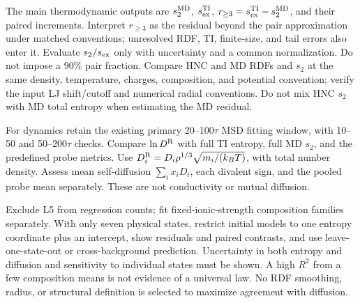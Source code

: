 \documentclass[11pt,a4paper]{article}
\begin{document}
The main thermodynamic outputs are $s_2^{\rm MD}$, $s_{\rm ex}^{\rm TI}$,
$r_{\ge3}=s_{\rm ex}^{\rm TI}-s_2^{\rm MD}$, and their paired increments.
Interpret $r_{\ge3}$ as the residual beyond the pair approximation under
matched conventions; unresolved RDF, TI, finite-size, and tail errors also
enter it. Evaluate $s_2/s_{\rm ex}$ only with uncertainty and a common
normalization. Do not impose a 90\% pair fraction. Compare HNC and MD RDFs
and $s_2$ at the same density, temperature, charges, composition, and potential
convention; verify the input LJ shift/cutoff and numerical radial conventions.
Do not mix HNC $s_2$ with MD total entropy when estimating the MD residual.

For dynamics retain the existing primary 20--100$\tau$ MSD fitting window,
with 10--50 and 50--200$\tau$ checks. Compare $\ln D^{\rm R}$ with full TI
entropy, full MD $s_2$, and the predefined probe metrics. Use
$D_i^{\rm R}=D_i\rho^{1/3}\sqrt{m_i/(k_BT)}$, with total number density.
Assess mean self-diffusion $\sum_ix_iD_i$, each divalent sign, and the pooled
probe mean separately. These are not conductivity or mutual diffusion.

Exclude L5 from regression counts; fit fixed-ionic-strength composition families
separately. With only seven physical states, restrict initial models to one
entropy coordinate plus an intercept, show residuals and paired contrasts,
and use leave-one-state-out or cross-background prediction. Uncertainty in
both entropy and diffusion and sensitivity to individual states must be shown.
A high $R^2$ from a few composition means is not evidence of a universal law.
No RDF smoothing, radius, or structural definition is selected to maximize
agreement with diffusion.
\end{document}
